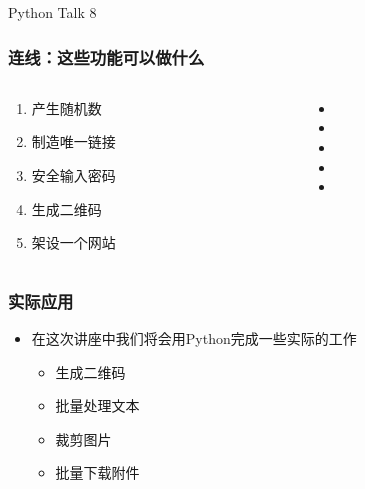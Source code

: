 


\begin{CJK}{UTF8}{gbsn}

\PreFirstFrame
\begin{frame} [fragile]
	\centerline{\fontsize{42}{42}\selectfont Python Talk 8}
\end{frame}
\PostFirstFrame

\begin{frame} [fragile]
	\frametitle{连线：这些功能可以做什么}
	\linespread{1.5}
	\begin{columns}[T]
		\begin{column}[T]{.5\textwidth}
			\begin{enumerate}
			\item 产生随机数
			\item 制造唯一链接
			\item 安全输入密码
			\item 生成二维码
			\item 架设一个网站
			\end{enumerate}
		\end{column}
		\begin{column}[T]{.5\textwidth}
			\begin{itemize}
			\item {}
			\item {}
			\item {}
			\item {}
			\item {}
			\end{itemize}
		\end{column}
	\end{columns}
\end{frame}

\begin{frame} [fragile]
	\frametitle{实际应用}
	\linespread{1.5}
	\begin{itemize}
	\item 在这次讲座中我们将会用Python完成一些实际的工作
		\begin{itemize}
		\item 生成二维码
		\item 批量处理文本
		\item 裁剪图片
		\item 批量下载附件
		\end{itemize}
	\end{itemize}
\end{frame}


\end{CJK}
